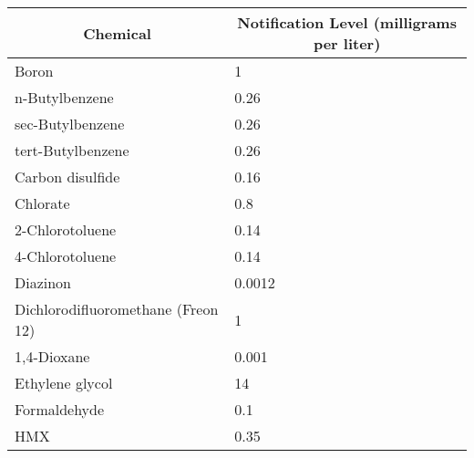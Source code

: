 \begin{table}[]
\begin{center}
\begin{tabular}{|l|l|}
\hline
\multicolumn{1}{|c|}{\textbf{Chemical}} & \multicolumn{1}{c|}{\textbf{Notification   Level (milligrams per liter)}} \\ \hline
Boron                                   & 1                                                                         \\ \hline
n-Butylbenzene                          & 0.26                                                                      \\ \hline
sec-Butylbenzene                        & 0.26                                                                      \\ \hline
tert-Butylbenzene                       & 0.26                                                                      \\ \hline
Carbon disulfide                        & 0.16                                                                      \\ \hline
Chlorate                                & 0.8                                                                       \\ \hline
2-Chlorotoluene                         & 0.14                                                                      \\ \hline
4-Chlorotoluene                         & 0.14                                                                      \\ \hline
Diazinon                                & 0.0012                                                                    \\ \hline
Dichlorodifluoromethane (Freon 12)      & 1                                                                         \\ \hline
1,4-Dioxane                             & 0.001                                                                     \\ \hline
Ethylene glycol                         & 14                                                                        \\ \hline
Formaldehyde                            & 0.1                                                                       \\ \hline
HMX                                     & 0.35                                                                      \\ \hline

\end{tabular}
\end{center}
\end{table}
